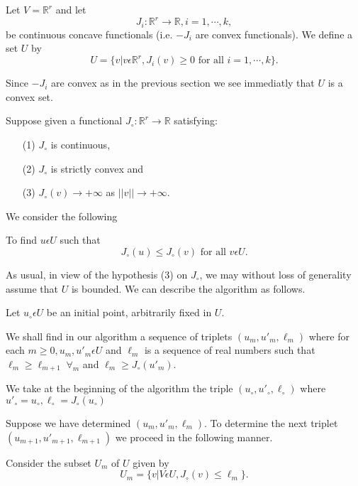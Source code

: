 Let $V = \mathbb{R}^{r}$ and let
$$
J_{i} : \mathbb{R}^{r} \to \mathbb{R}, i = 1, \cdots, k,
$$
be continuous concave functionals (i.e. $-J_{i}$ are convex functionals). We define a set $U$ by
$$
U = \{v | v \epsilon \mathbb{R}^{r}, J_{i}(v) \geq 0 \text{ for all } i = 1, \cdots, k\}.
$$\pageoriginale

Since $-J_{i}$ are convex as in the previous section we see immediatly that $U$ is a convex set.

Suppose given a functional $J_{\circ} : \mathbb{R}^{r} \to \mathbb{R}$ satisfying:
\begin{enumerate}
\item[(1)] $J_{\circ}$ is continuous,\\
\item[(2)] $J_{\circ}$ is strictly convex and\\
\item[(3)] $J_{\circ}(v) \to + \infty$ as $||v|| \to + \infty$.
\end{enumerate}

We consider the following 
\begin{problem}\label{chap4-prob2.1}
To find $u \epsilon U$ such that
$$
J_{\circ}(u) \leq J_{\circ}(v) \text{ for all } v \epsilon U.
$$
\end{problem}

As usual, in view of the hypothesis (3) on $J_{\circ}$, we may without loss of generality assume that $U$ is bounded. We can describe the algorithm as follows.

Let $u_{\circ} \epsilon U$ be an initial point, arbitrarily fixed in $U$.

We shall find in our algorithm a sequence of triplets $(u_{m}, u'_{m}, \ell_{m})$ where for each $m \geq 0, u_{m}, u'_{m} \epsilon U$ and $\ell_{m}$ is a sequence of real numbers such that $\ell_{m} \geq \ell_{m+1} \; \forall_{m}$ and $\ell_{m} \geq J_{\circ} (u'_{m})$.

We take at the beginning of the algorithm the triple $(u_{\circ}, u'_{\circ}, \ell_{\circ})$ where $u'_{\circ} = u_{\circ}, \ell_{\circ} = J_{\circ} (u_{\circ})$

Suppose we have determined $(u_{m}, u'_{m}, \ell_{m})$. To determine the next triplet $(u_{m+1}, u'_{m+1}, \ell_{m+1})$ we proceed in the following manner.

Consider the subset $U_{m}$ of $U$ given by
\begin{equation*}
U_{m} = \{v | V \epsilon U, J_{\circ} (v) \leq \ell_{m}\}.\tag{2.1}\label{chap4-eq2.1}
\end{equation*}

